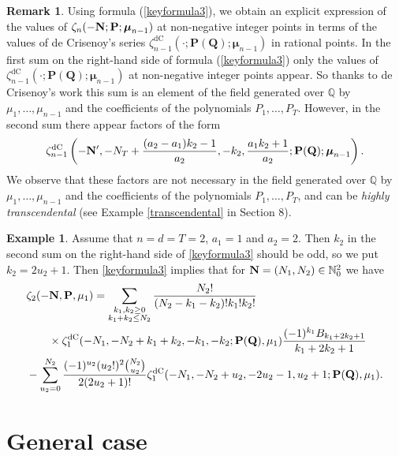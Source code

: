 \documentclass[a4paper,12pt]{article}
\theoremstyle{definition}
\newtheorem{example}[thm]{Example}
\newtheorem{rem}[thm]{Remark}
\numberwithin{equation}{section}
\def\N{{\mathbb N}}
\def\Q{{\mathbb Q}}
\def\Nb{{\bf N}}
\def\P{{\bf P}}
\newcommand{\mub}{\boldsymbol{\mu}}
\newcommand{\dc}{\mathrm{dC}}
\begin{document}
\begin{rem}
Using formula (\ref{keyformula3}), we obtain an explicit expression of the values of
$\zeta_n(-\Nb;\P;\mub_{n-1})$ at non-negative integer points in terms of the values of de Crisenoy's series $\zeta_{n-1}^{\dc}(\cdot;\mathbf{P(Q)};\boldsymbol{\mu}_{n-1})$ in rational points. 
In the first sum on the right-hand side of formula (\ref{keyformula3}) only the values of $\zeta_{n-1}^{\dc}(\cdot; \mathbf{P(Q)};\boldsymbol{\mu}_{n-1})$ at non-negative integer points appear. So thanks to de Crisenoy's work this sum is an element of the field generated over $\Q$ by $\mu_1,\ldots, \mu_{n-1}$ and the coefficients of the polynomials $P_1,\ldots, P_T$.
However, in the second sum there appear factors of the form 
$$
\zeta_{n-1}^{\dc}\left(-\Nb', -N_T+\frac{(a_2-a_1)k_2-1}{a_2}, - k_2, \frac{a_1k_2+1}{a_2}; \mathbf{P(Q)};\boldsymbol{\mu}_{n-1}\right).
$$ 
We observe that
these factors are not necessary in the field generated over $\Q$ by $\mu_1,\ldots,\mu_{n-1}$ and the coefficients of the polynomials $P_1,\ldots, P_T$, and can be {\it highly transcendental} (see Example \ref{transcendental} in Section 8).
\end{rem}

\begin{example}
Assume that $n=d=T=2$, $a_1=1$ and $a_2=2$. Then $k_2$ in the second sum on the right-hand side of \eqref{keyformula3} should be odd, so
we put $k_2=2u_2+1$.
Then \eqref{keyformula3} implies that for $\Nb=(N_1, N_2)\in \N_0^2$ we have
\begin{align}\label{keyformula3bis}
&\zeta_2(-\Nb,\P,\mu_1)=\sum_{\substack{k_1, k_2 \geq 0 \\ k_1+k_2 \leq N_2}}\frac{N_2 !}{(N_2-k_1-k_2)! k_1! k_2!} \notag \\
& \qquad\times\zeta_1^{\dc}(-N_1, -N_2+k_1+k_2, -k_1, -k_2; \mathbf{P(Q)},\mu_1) \frac{(-1)^{k_1} B_{k_1+2k_2+1}}{k_1+2k_2+1} \notag\\
 & - \sum_{u_2=0}^{N_2}\frac{(-1)^{u_2} (u_2!)^2 \binom{N_2}{u_2}}{2(2u_2+1)!} \zeta_1^{\dc}(-N_1, -N_2+u_2, -2u_2-1, u_2+1; \mathbf{P(Q)},\mu_1).
\end{align}
\end{example}

\section{General case}
\label{section:general_case}
\end{document}
